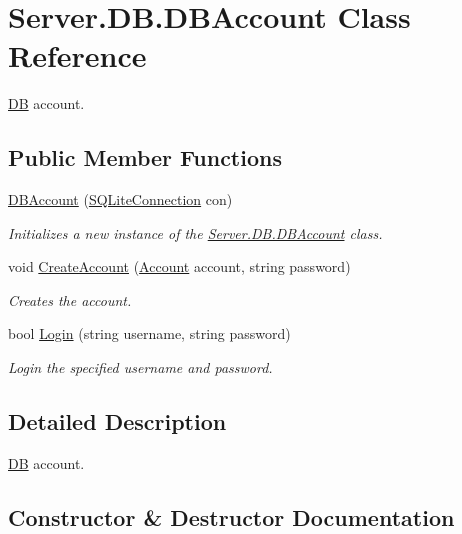 \hypertarget{classServer_1_1DB_1_1DBAccount}{}\section{Server.\+D\+B.\+D\+B\+Account Class Reference}
\label{classServer_1_1DB_1_1DBAccount}


\hyperlink{namespaceServer_1_1DB}{D\+B} account.  


\subsection*{Public Member Functions}
\begin{DoxyCompactItemize}
\item 
\hyperlink{classServer_1_1DB_1_1DBAccount_a09329b7a7cc362eca6d1d54571159395}{D\+B\+Account} (\hyperlink{classSQLite_1_1SQLiteConnection}{S\+Q\+Lite\+Connection} con)
\begin{DoxyCompactList}\small\item\em Initializes a new instance of the \hyperlink{classServer_1_1DB_1_1DBAccount}{Server.\+D\+B.\+D\+B\+Account} class. \end{DoxyCompactList}\item 
void \hyperlink{classServer_1_1DB_1_1DBAccount_a3b7e2921efb6f6e7ceecba07d3068a1f}{Create\+Account} (\hyperlink{classCore_1_1Models_1_1Account}{Account} account, string password)
\begin{DoxyCompactList}\small\item\em Creates the account. \end{DoxyCompactList}\item 
bool \hyperlink{classServer_1_1DB_1_1DBAccount_a53bbc0085fc15347e5d67ff1ee9ee925}{Login} (string username, string password)
\begin{DoxyCompactList}\small\item\em Login the specified username and password. \end{DoxyCompactList}\end{DoxyCompactItemize}


\subsection{Detailed Description}
\hyperlink{namespaceServer_1_1DB}{D\+B} account. 



\subsection{Constructor \& Destructor Documentation}
\hypertarget{classServer_1_1DB_1_1DBAccount_a09329b7a7cc362eca6d1d54571159395}{}
